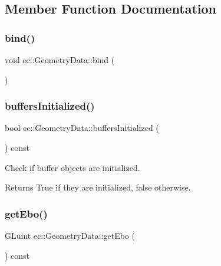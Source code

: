 \subsection{Member Function Documentation}
\mbox{\label{classec_1_1_geometry_data_acb50971e6fbd928172731a3427d22691}} 
\subsubsection{\texorpdfstring{bind()}{bind()}}
{\footnotesize\ttfamily void ec\+::\+Geometry\+Data\+::bind (\begin{DoxyParamCaption}{ }\end{DoxyParamCaption})}

\mbox{\label{classec_1_1_geometry_data_a23c0090061b5b21b74f070916915ca69}} 
\subsubsection{\texorpdfstring{buffers\+Initialized()}{buffersInitialized()}}
{\footnotesize\ttfamily bool ec\+::\+Geometry\+Data\+::buffers\+Initialized (\begin{DoxyParamCaption}{ }\end{DoxyParamCaption}) const}

Check if buffer objects are initialized. \begin{DoxyReturn}{Returns}
True if they are initialized, false otherwise. 
\end{DoxyReturn}
\mbox{\label{classec_1_1_geometry_data_ae3f427f933c595b169bd10551d52abc3}} 
\subsubsection{\texorpdfstring{get\+Ebo()}{getEbo()}}
{\footnotesize\ttfamily G\+Luint ec\+::\+Geometry\+Data\+::get\+Ebo (\begin{DoxyParamCaption}{ }\end{DoxyParamCaption}) const}

